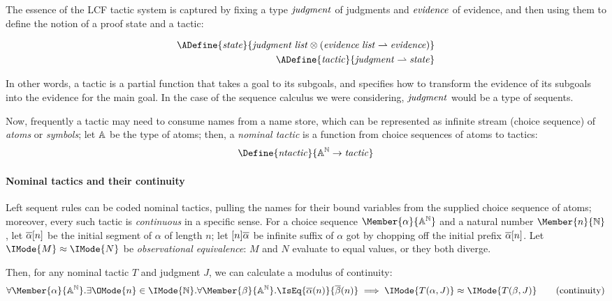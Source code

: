 The essence of the LCF tactic system is captured by fixing a type
$\mathit{judgment}$ of judgments and $\mathit{evidence}$ of evidence, and then using them
to define the notion of a proof state and a tactic:

\begin{align*}
  \ADefine{
    \LCFState
  }{
    \MLList{\LCFJudgment} \otimes (\PartialFun{\MLList{\LCFEvidence}}{\LCFEvidence})
  }\\
  \ADefine{
    \LCFTactic
  }{
    \PartialFun{\LCFJudgment}{\LCFState}
  }
\end{align*}

In other words, a tactic is a partial function that takes a goal to its
subgoals, and specifies how to transform the evidence of its subgoals into the
evidence for the main goal. In the case of the sequence calculus we were
considering, $\mathit{judgment}$ would be a type of sequents.


Now, frequently a tactic may need to consume names from a name store, which can
be represented as infinite stream (choice sequence) of \emph{atoms} or
\emph{symbols}; let $\mathbb{A}$ be the type of atoms; then, a \emph{nominal
tactic} is a function from choice sequences of atoms to tactics:
\[
  \Define{
    \LCFNominalTactic
  }{
    \MLStream{\MLAtom}\to\LCFTactic
  }
\]

\newcommand\KleeneEq[2]{\IMode{#1}\approx \IMode{#2}}
\newcommand\ModC[1]{\mathsf{M}(#1)}

\paragraph{Nominal tactics and their continuity}

Left sequent rules can be coded nominal tactics, pulling the names for their bound
variables from the supplied choice sequence of atoms; moreover, every such tactic
is \emph{continuous} in a specific sense. For a choice sequence
$\Member{\alpha}{\MLStream{\MLAtom}}$ and a natural number
$\Member{n}{\MLNat}$, let $\protect\overline{\alpha}[n]$ be the initial segment of
$\alpha$ of length $n$; let $[n]\protect\overline{\alpha}$ be infinite suffix of
$\alpha$ got by chopping off the initial prefix $\protect\overline{\alpha}[n]$. Let
$\KleeneEq{M}{N}$ be \emph{observational equivalence}: $M$ and $N$ evaluate to
equal values, or they both diverge.

Then, for any nominal tactic $T$ and judgment $J$, we can calculate a
modulus of continuity:
\begin{equation}
  \forall \Member{\alpha}{\MLStream{\MLAtom}}.
  \exists \OMode{n}\in\IMode{\MLNat}.
  \forall \Member{\beta}{\MLStream{\MLAtom}}.
    \IsEq{\bar{\alpha}(n)}{\bar{\beta}(n)}\implies \KleeneEq{T(\alpha,J)}{T(\beta,J)}
  \tag{continuity}
\end{equation}

